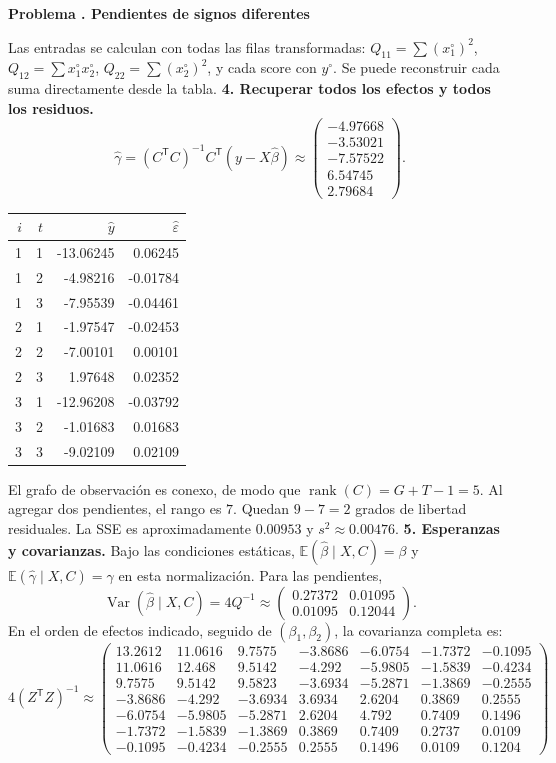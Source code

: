 \documentclass[11pt,a4paper]{article}
\newcommand{\E}{\mathbb E}
\newcommand{\T}{^{\mathsf T}}
\DeclareMathOperator{\Var}{Var}
\DeclareMathOperator{\rank}{rank}
\theoremstyle{definition}
\newcounter{problema}
\newenvironment{resuelto}[1]{\refstepcounter{problema}\par\medskip\Needspace{6\baselineskip}\textbf{Problema \theproblema. #1}\par}{\par\medskip}
\newcommand{\eps}{\varepsilon}
\begin{document}
\begin{resuelto}{Pendientes de signos diferentes}
\[\]
Las entradas se calculan con todas las filas transformadas: $Q_{11}=\sum (x_1^\circ)^2$, $Q_{12}=\sum x_1^\circ x_2^\circ$, $Q_{22}=\sum (x_2^\circ)^2$, y cada score con $y^\circ$. Se puede reconstruir cada suma directamente desde la tabla.
\textbf{4. Recuperar todos los efectos y todos los residuos.}
\[
\widehat\gamma=(C\T C)^{-1}C\T(y-X\widehat\beta)\approx\begin{pmatrix}
-4.97668\\-3.53021\\-7.57522\\6.54745\\2.79684
\end{pmatrix}.
\]

\begin{center}\small
\begin{tabular}{rrrr}
\toprule
$i$&$t$&$\widehat y$&$\widehat\eps$\\
\midrule
1&1&-13.06245&0.06245\\
1&2&-4.98216&-0.01784\\
1&3&-7.95539&-0.04461\\
2&1&-1.97547&-0.02453\\
2&2&-7.00101&0.00101\\
2&3&1.97648&0.02352\\
3&1&-12.96208&-0.03792\\
3&2&-1.01683&0.01683\\
3&3&-9.02109&0.02109\\
\bottomrule
\end{tabular}
\end{center}
El grafo de observación es conexo, de modo que $\rank(C)=G+T-1=5$. Al agregar dos pendientes, el rango es $7$. Quedan $9-7=2$ grados de libertad residuales. La SSE es aproximadamente $0.00953$ y $s^2\approx0.00476$.
\textbf{5. Esperanzas y covarianzas.} Bajo las condiciones estáticas, $\E(\widehat\beta\mid X,C)=\beta$ y $\E(\widehat\gamma\mid X,C)=\gamma$ en esta normalización. Para las pendientes,
\[
\Var(\widehat\beta\mid X,C)=4Q^{-1}\approx\begin{pmatrix}
0.27372&0.01095\\0.01095&0.12044
\end{pmatrix}.
\]
En el orden de efectos indicado, seguido de $(\beta_1,\beta_2)$, la covarianza completa es:
{\small
\[
4(Z\T Z)^{-1}\approx\begin{pmatrix}
13.2612&11.0616&9.7575&-3.8686&-6.0754&-1.7372&-0.1095\\11.0616&12.468&9.5142&-4.292&-5.9805&-1.5839&-0.4234\\9.7575&9.5142&9.5823&-3.6934&-5.2871&-1.3869&-0.2555\\-3.8686&-4.292&-3.6934&3.6934&2.6204&0.3869&0.2555\\-6.0754&-5.9805&-5.2871&2.6204&4.792&0.7409&0.1496\\-1.7372&-1.5839&-1.3869&0.3869&0.7409&0.2737&0.0109\\-0.1095&-0.4234&-0.2555&0.2555&0.1496&0.0109&0.1204

\end{pmatrix}\]}
\end{resuelto}
\end{document}
